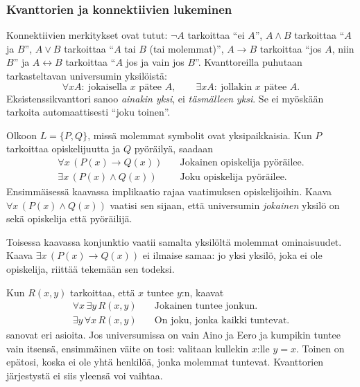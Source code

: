 \documentclass[11pt,a4paper]{amsart}
\begin{document}
\clearpage
\subsubsection{Kvanttorien ja konnektiivien lukeminen}

Konnektiivien merkitykset ovat tutut: $\neg A$ tarkoittaa ``ei $A$'',
$A\land B$ tarkoittaa ``$A$ ja $B$'', $A\lor B$ tarkoittaa
``$A$ tai $B$ (tai molemmat)'', $A\to B$ tarkoittaa ``jos $A$, niin $B$''
ja $A\leftrightarrow B$ tarkoittaa ``$A$ jos ja vain jos $B$''.
Kvanttoreilla puhutaan tarkasteltavan universumin yksilöistä:
\[
  \forall x A:\ \text{jokaisella }x\text{ pätee }A,
  \qquad
  \exists x A:\ \text{jollakin }x\text{ pätee }A.
\]
Eksistenssikvanttori sanoo \emph{ainakin yksi}, ei \emph{täsmälleen yksi}.
Se ei myöskään tarkoita automaattisesti ``joku toinen''.

\begin{example}
  Olkoon $L=\{P,Q\}$, missä molemmat symbolit ovat yksipaikkaisia.
  Kun $P$ tarkoittaa opiskelijuutta ja $Q$ pyöräilyä, saadaan
  \begin{align*}
    \forall x\,(P(x)\to Q(x))
    &\quad\text{Jokainen opiskelija pyöräilee.}\\
    \exists x\,(P(x)\land Q(x))
    &\quad\text{Joku opiskelija pyöräilee.}
  \end{align*}
  Ensimmäisessä kaavassa implikaatio rajaa vaatimuksen opiskelijoihin.
  Kaava $\forall x\,(P(x)\land Q(x))$ vaatisi sen sijaan, että
  universumin \emph{jokainen} yksilö on sekä opiskelija että pyöräilijä.

  Toisessa kaavassa konjunktio vaatii samalta yksilöltä molemmat
  ominaisuudet. Kaava $\exists x\,(P(x)\to Q(x))$ ei ilmaise samaa:
  jo yksi yksilö, joka ei ole opiskelija, riittää tekemään sen todeksi.
\end{example}

\begin{example}
  Kun $R(x,y)$ tarkoittaa, että $x$ tuntee $y$:n, kaavat
  \begin{align*}
    \forall x\,\exists y\,R(x,y)
    &\quad\text{Jokainen tuntee jonkun.}\\
    \exists y\,\forall x\,R(x,y)
    &\quad\text{On joku, jonka kaikki tuntevat.}
  \end{align*}
  sanovat eri asioita. Jos universumissa on vain Aino ja Eero ja
  kumpikin tuntee vain itsensä, ensimmäinen väite on tosi: valitaan
  kullekin $x$:lle $y=x$. Toinen on epätosi, koska ei ole yhtä
  henkilöä, jonka molemmat tuntevat. Kvanttorien järjestystä ei siis
  yleensä voi vaihtaa.
\end{example}
\end{document}
